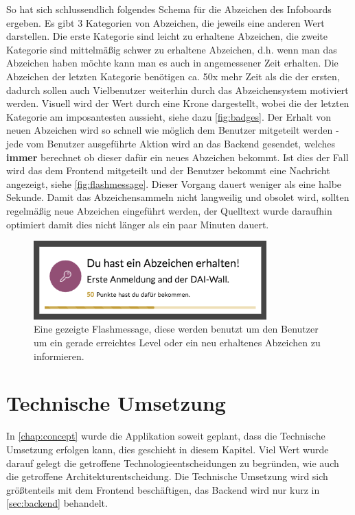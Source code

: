 \documentclass[12pt,twoside]{book}
\begin{document}
So hat sich schlussendlich folgendes Schema für die Abzeichen des Infoboards ergeben. Es gibt 3 Kategorien von Abzeichen, die jeweils eine anderen Wert darstellen. Die erste Kategorie sind leicht zu erhaltene Abzeichen, die zweite Kategorie sind mittelmäßig schwer zu erhaltene Abzeichen, d.h. wenn man das Abzeichen haben möchte kann man es auch in angemessener Zeit erhalten. Die Abzeichen der letzten Kategorie benötigen ca. 50x mehr Zeit als die der ersten, dadurch sollen auch Vielbenutzer weiterhin durch das Abzeichensystem motiviert werden. Visuell wird der Wert durch eine Krone dargestellt, wobei die der letzten Kategorie am imposantesten aussieht, siehe dazu \ref{fig:badges}.
Der Erhalt von neuen Abzeichen wird so schnell wie möglich dem Benutzer mitgeteilt werden - jede vom Benutzer ausgeführte Aktion wird an das Backend gesendet, welches \textbf{immer} berechnet ob dieser dafür ein neues Abzeichen bekommt. Ist dies der Fall wird das dem Frontend mitgeteilt und der Benutzer bekommt eine Nachricht angezeigt, siehe \ref{fig:flashmessage}. Dieser Vorgang dauert weniger als eine halbe Sekunde.
Damit das Abzeichensammeln nicht langweilig und obsolet wird, sollten regelmäßig neue Abzeichen eingeführt werden, der Quelltext wurde daraufhin optimiert damit dies nicht länger als ein paar Minuten dauert.

\begin{figure}[H]
    \centering
    \includegraphics[width=0.8\textwidth]{images/infoboard_flashmessage.png}
    \caption{Eine gezeigte Flashmessage, diese werden benutzt um den Benutzer um ein gerade erreichtes Level oder ein neu erhaltenes Abzeichen zu informieren.}
    \label{fig:infoboard_flashmessage}
\end{figure}

\chapter{Technische Umsetzung}\label{chap:tech}

In \ref{chap:concept} wurde die Applikation soweit geplant, dass die Technische Umsetzung erfolgen kann, dies geschieht in diesem Kapitel. Viel Wert wurde darauf gelegt die getroffene Technologieentscheidungen zu begründen, wie auch die getroffene Architekturentscheidung.
Die Technische Umsetzung wird sich größtenteils mit dem Frontend beschäftigen, das Backend wird nur kurz in \ref{sec:backend} behandelt.
\end{document}
